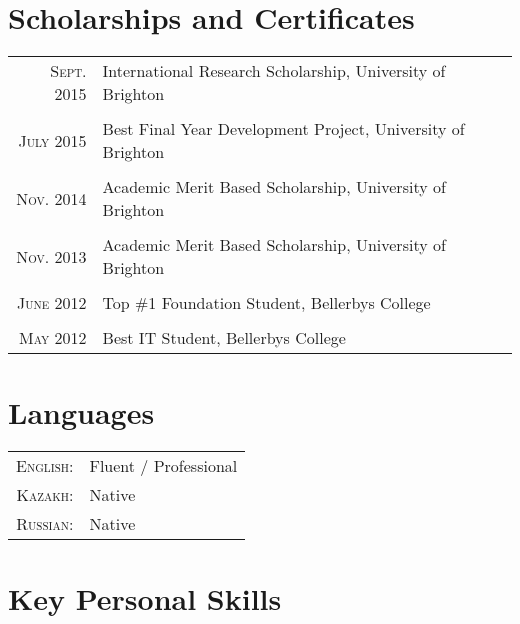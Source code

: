 \documentclass[a4paper,10pt]{article} %
\begin{document}
\section{Scholarships and Certificates}

\begin{tabular}{rl}
\textsc{Sept.} 2015 & International Research Scholarship, University of Brighton \normalsize\\
\\
\textsc{July} 2015 & Best Final Year Development Project, University of Brighton \\
\\
\textsc{Nov.} 2014 & Academic Merit Based Scholarship, University of Brighton \\
\\
\textsc{Nov.} 2013 & Academic Merit Based Scholarship, University of Brighton \\
\\
\textsc{June} 2012 & Top \#1 Foundation Student, Bellerbys College \\
\\
\textsc{May} 2012 & Best IT Student, Bellerbys College \\
\end{tabular}


\section{Languages}

\begin{tabular}{rl}
\textsc{English:} & Fluent / Professional\\

\textsc{Kazakh:} & Native\\

\textsc{Russian:} & Native\\
\end{tabular}
\bigskip


\section{Key Personal Skills}
\end{document}
